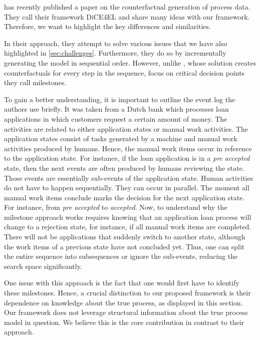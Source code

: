 \documentclass[./../../paper.tex]{subfiles}
\begin{document}
\citeauthor{hsieh_DiCE4ELInterpretingProcess_2021} has recently published a paper on the counterfactual generation of process data. They call their framework DiCE4EL and share many ideas with our framework. Therefore, we want to highlight the key differences and similarities. 

In their approach, they attempt to solve various issues that we have also highlighted in \autoref{sec:challenges}. Furthermore, they do so by incrementally generating the model in sequential order. However, unlike \citeauthor{oberst_CounterfactualOffPolicyEvaluation_2019}, whose solution creates counterfactuals for every step in the sequence, \citeauthor{hsieh_DiCE4ELInterpretingProcess_2021} focus on critical decision points they call milestones. 

To gain a better understanding, it is important to outline the event log the authors use briefly. It was taken from a Dutch bank which processes loan applications in which customers request a certain amount of money. The activities are related to either application states or manual work activities. The application states consist of tasks generated by a machine and manual work activities produced by humans. Hence, the manual work items occur in reference to the application state. For instance, if the loan application is in a \emph{pre accepted} state, then the next events are often produced by humans reviewing the state. Those events are essentially sub-events of the application state. Human activities do not have to happen sequentially. They can occur in parallel. The moment all manual work items conclude marks the decision for the next application state. For instance, from \emph{pre accepted} to \emph{accepted}. Now, to understand why the milestone approach works requires knowing that an application loan process will change to a rejection state, for instance, if all manual work items are completed. There will not be applications that suddenly switch to another state, although the work items of a previous state have not concluded yet. Thus, one can split the entire sequence into subsequences or ignore the sub-events, reducing the search space significantly. 

One issue with this approach is the fact that one would first have to identify these milestones. Hence, a crucial distinction to our proposed framework is their dependence on knowledge about the true process, as displayed in this section. Our framework does not leverage structural information about the true process model in question. We believe this is the core contribution in contrast to their approach.
\end{document}
